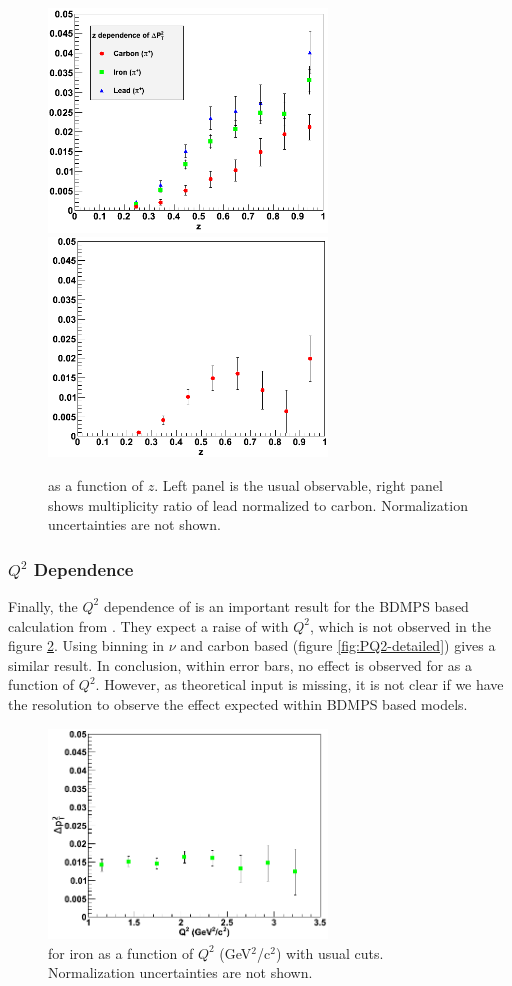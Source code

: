 \begin{figure}[tbp]
\centering
\includegraphics[width=7.4cm] {chap6-fig/F_PvZ.png} 
\includegraphics[width=7.4cm] {chap6-fig/F_PvZ_PbC.png} 
\caption {\dpt as a function of $z$. Left panel is the usual
observable, right panel shows multiplicity ratio of lead normalized to carbon. Normalization uncertainties are not shown.}
\label{fig:PZ}
\end{figure}

\subsubsection{$Q^2$ Dependence}

Finally, the $Q^2$ dependence of \dpt is an important result for the BDMPS based 
calculation from \cite{Domdey:2008aq}. They expect a raise of \dpt with $Q^2$,
which is not observed in the figure \ref{fig:PQ2}. Using
binning in $\nu$ and carbon based \dpt (figure \ref{fig:PQ2-detailed}) gives a similar
result. In conclusion, within error bars, no effect is observed for \dpt as a function of $Q^2$.
However, as theoretical input is missing, it is not clear if we have the resolution to observe
the effect expected within BDMPS based models.

\begin{figure}[tbp]
\centering
\includegraphics[width=7.4cm] {chap6-fig/F_PvQ2.png} 
\caption {\dpt for iron as a function of $Q^2$ (GeV$^2$/c$^2$) 
with usual cuts. Normalization uncertainties are not shown.}
\label{fig:PQ2}
\end{figure}


